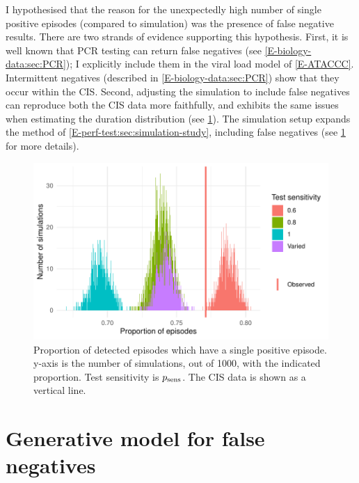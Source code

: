\documentclass[thesis.tex]{subfiles}
\begin{document}
I hypothesised that the reason for the unexpectedly high number of single positive episodes (compared to simulation) was the presence of false negative results.
There are two strands of evidence supporting this hypothesis.
First, it is well known that PCR testing can return false negatives  (see \cref{E-biology-data:sec:PCR}); I explicitly include them in the viral load model of \cref{E-ATACCC}.
Intermittent negatives (described in  \cref{E-biology-data:sec:PCR}) show that they occur within the CIS.
Second, adjusting the simulation to include false negatives can reproduce both the CIS data more faithfully, and exhibits the same issues when estimating the duration distribution (see \cref{imperf-test:fig:sim-single-pos}).
The simulation setup expands the method of \cref{E-perf-test:sec:simulation-study}, including false negatives (see \cref{imperf-test:sec:simulate} for more details).
\begin{figure}
  \centering \includegraphics{cis-imperfect-testing/sim-single-positive-episodes}
  \caption[Single positive episodes in CIS simulation]{%
    Proportion of detected episodes which have a single positive episode.
    y-axis is the number of simulations, out of 1000, with the indicated proportion.
    Test sensitivity is $p_\text{sens}$.
    The CIS data is shown as a vertical line.
  }
  \label{imperf-test:fig:sim-single-pos}
\end{figure}

\section{Generative model for false negatives} \label{imperf-test:sec:simulate}
\end{document}
